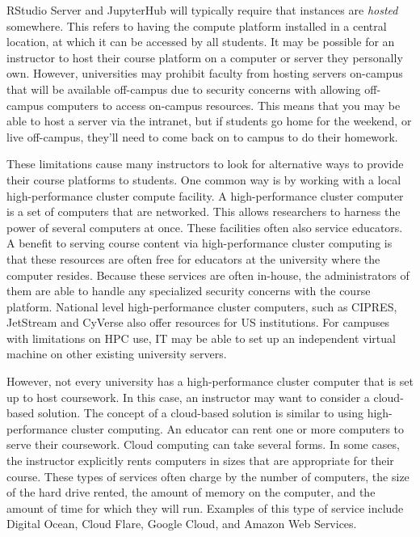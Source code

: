 RStudio Server and JupyterHub will typically require that instances are \textit{hosted} somewhere.
This refers to having the compute platform installed in a central location, at which it can be accessed by all students.
It may be possible for an instructor to host their course platform on a computer or server they personally own.
However, universities may prohibit faculty from hosting servers on-campus that will be available off-campus due to security concerns with allowing off-campus computers to access on-campus resources.
This means that you may be able to host a server via the intranet, but if students go home for the weekend, or live off-campus, they'll need to come back on to campus to do their homework.

These limitations cause many instructors to look for alternative ways to provide their course platforms to students.
One common way is by working with a local high-performance cluster compute facility.
A high-performance cluster computer is a set of computers that are networked. 
This allows researchers to harness the power of several computers at once.
These facilities often also service educators.
A benefit to serving course content via high-performance cluster computing is that these resources are often free for educators at the university where the computer resides.
Because these services are often in-house, the administrators of them are able to handle any specialized security concerns with the course platform.
National level high-performance cluster computers, such as CIPRES, JetStream and CyVerse also offer resources for US institutions.
For campuses with limitations on HPC use, IT may be able to set up an independent virtual machine
on other existing university servers.

However, not every university has a high-performance cluster computer that is set up to host coursework. 
In this case, an instructor may want to consider a cloud-based solution. 
The concept of a cloud-based solution is similar to using high-performance cluster computing.
An educator can rent one or more computers to serve their coursework. 
Cloud computing can take several forms. 
In some cases, the instructor explicitly rents computers in sizes that are appropriate for their course.
These types of services often charge by the number of computers, the size of the hard drive rented, the amount of memory on the computer, and the amount of time for which they will run.
Examples of this type of service include Digital Ocean, Cloud Flare, Google Cloud, and Amazon Web Services.


